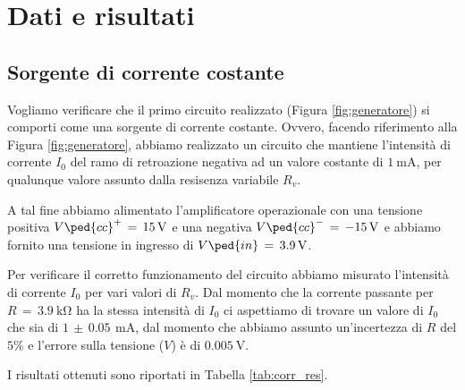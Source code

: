 \section*{Dati e risultati}

\subsection*{Sorgente di corrente costante}

Vogliamo verificare che il primo circuito realizzato (Figura \ref{fig:generatore}) si comporti come una sorgente di corrente costante. Ovvero, facendo riferimento alla Figura \ref{fig:generatore}, abbiamo realizzato un circuito che mantiene l'intensità di corrente $I_0$ del ramo di retroazione negativa ad un valore costante di $\SI{1}{\milli\ampere}$, per qualunque valore assunto dalla resisenza variabile $R_v$.

A tal fine abbiamo alimentato l'amplificatore operazionale con una tensione positiva $V\ped{cc}^+\,=\,\SI{+15}{\volt}$ e una negativa $V\ped{cc}^-\,=\,\SI{-15}{\volt}$ e abbiamo fornito una tensione in ingresso di $V\ped{in}\,=\,\SI{+3.9}{\volt}$.

Per verificare il corretto funzionamento del circuito abbiamo misurato l'intensità di corrente $I_0$ per vari valori di $R_v$.  Dal momento che la corrente passante per $R\,=\,\SI{3.9}{\kilo\ohm}$ ha la stessa intensità di $I_0$ ci aspettiamo di trovare un valore di $I_0$ che sia di $1\,\pm\,0.05\,\SI{}{\milli\ampere}$, dal momento che abbiamo assunto un'incertezza di $R$ del $5\%$ e l'errore sulla tensione ($V$) è di $\SI{0.005}{\volt}$.

I risultati ottenuti sono riportati in Tabella \ref{tab:corr_res}.

